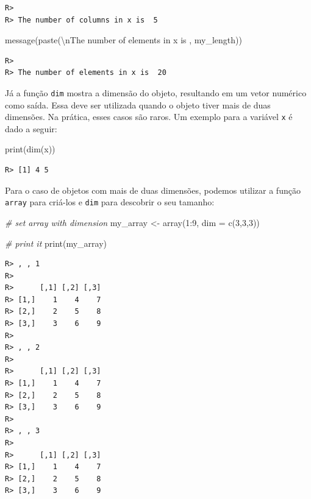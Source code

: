 \documentclass[
  11pt,
]{book}
\newenvironment{Shaded}{\begin{snugshade}}{\end{snugshade}}
\newcommand{\AttributeTok}[1]{\textcolor[rgb]{0.61,0.61,0.61}{#1}}
\newcommand{\CommentTok}[1]{\textcolor[rgb]{0.37,0.37,0.37}{\textit{#1}}}
\newcommand{\DecValTok}[1]{\textcolor[rgb]{0.06,0.06,0.06}{#1}}
\newcommand{\FunctionTok}[1]{\textcolor[rgb]{0,0,0}{#1}}
\newcommand{\NormalTok}[1]{#1}
\newcommand{\OtherTok}[1]{\textcolor[rgb]{0.37,0.37,0.37}{#1}}
\newcommand{\SpecialCharTok}[1]{\textcolor[rgb]{0,0,0}{#1}}
\newcommand{\StringTok}[1]{\textcolor[rgb]{0.5,0.5,0.5}{#1}}
\begin{document}
\begin{verbatim}
R> 
R> The number of columns in x is  5
\end{verbatim}

\begin{Shaded}
\begin{Highlighting}[]
\FunctionTok{message}\NormalTok{(}\FunctionTok{paste}\NormalTok{(}\StringTok{\textquotesingle{}}\SpecialCharTok{\textbackslash{}n}\StringTok{The number of elements in x is \textquotesingle{}}\NormalTok{, my\_length))}
\end{Highlighting}
\end{Shaded}

\begin{verbatim}
R> 
R> The number of elements in x is  20
\end{verbatim}

Já a função \texttt{dim} mostra a dimensão do objeto, resultando em um vetor numérico como saída. Essa deve ser utilizada quando o objeto tiver mais de duas dimensões. Na prática, esses casos são raros. Um exemplo para a variável \texttt{x} é dado a seguir:

\begin{Shaded}
\begin{Highlighting}[]
\FunctionTok{print}\NormalTok{(}\FunctionTok{dim}\NormalTok{(x))}
\end{Highlighting}
\end{Shaded}

\begin{verbatim}
R> [1] 4 5
\end{verbatim}

Para o caso de objetos com mais de duas dimensões, podemos utilizar a função \texttt{array} para criá-los e \texttt{dim} para descobrir o seu tamanho:

\begin{Shaded}
\begin{Highlighting}[]
\CommentTok{\# set array with dimension}
\NormalTok{my\_array }\OtherTok{\textless{}{-}} \FunctionTok{array}\NormalTok{(}\DecValTok{1}\SpecialCharTok{:}\DecValTok{9}\NormalTok{, }\AttributeTok{dim =} \FunctionTok{c}\NormalTok{(}\DecValTok{3}\NormalTok{,}\DecValTok{3}\NormalTok{,}\DecValTok{3}\NormalTok{))}

\CommentTok{\# print it}
\FunctionTok{print}\NormalTok{(my\_array)}
\end{Highlighting}
\end{Shaded}

\begin{verbatim}
R> , , 1
R> 
R>      [,1] [,2] [,3]
R> [1,]    1    4    7
R> [2,]    2    5    8
R> [3,]    3    6    9
R> 
R> , , 2
R> 
R>      [,1] [,2] [,3]
R> [1,]    1    4    7
R> [2,]    2    5    8
R> [3,]    3    6    9
R> 
R> , , 3
R> 
R>      [,1] [,2] [,3]
R> [1,]    1    4    7
R> [2,]    2    5    8
R> [3,]    3    6    9
\end{verbatim}
\end{document}
